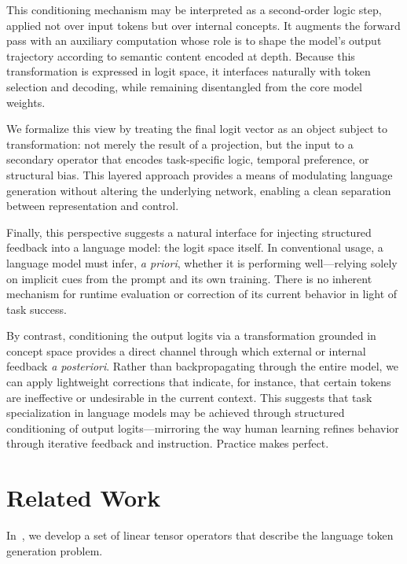 \documentclass[12pt]{article}
\theoremstyle{plain}
\begin{document}
This conditioning mechanism may be interpreted as a second-order logic step, applied not over 
input tokens but over internal concepts. It augments the forward pass with an auxiliary computation 
whose role is to shape the model’s output trajectory according to semantic content encoded at depth. 
Because this transformation is expressed in logit space, it interfaces naturally with token selection 
and decoding, while remaining disentangled from the core model weights.

We formalize this view by treating the final logit vector as an object subject to transformation: 
not merely the result of a projection, but the input to a secondary operator that encodes 
task-specific logic, temporal preference, or structural bias. This layered approach provides a 
means of modulating language generation without altering the underlying network, enabling a clean 
separation between representation and control.

Finally, this perspective suggests a natural interface for injecting structured feedback into a 
language model: the logit space itself. In conventional usage, a language model must infer, 
\emph{a priori}, whether it is performing well—relying solely on implicit cues from the prompt 
and its own training. There is no inherent mechanism for runtime evaluation or correction of 
its current behavior in light of task success.

By contrast, conditioning the output logits via a transformation grounded in concept space provides 
a direct channel through which external or internal feedback \emph{a posteriori}. Rather than 
backpropagating through the entire model, we can apply lightweight corrections that indicate, 
for instance, that certain tokens are ineffective or undesirable in the current context. 
This suggests that task specialization in language models may be achieved through structured 
conditioning of output logits---mirroring the way human learning refines behavior through iterative 
feedback and instruction. Practice makes perfect.


\section{Related Work}

In~\cite{Cochran2025HierarchicalLogic}, we develop a set of linear tensor operators
that describe the language token generation problem.




\end{document}
